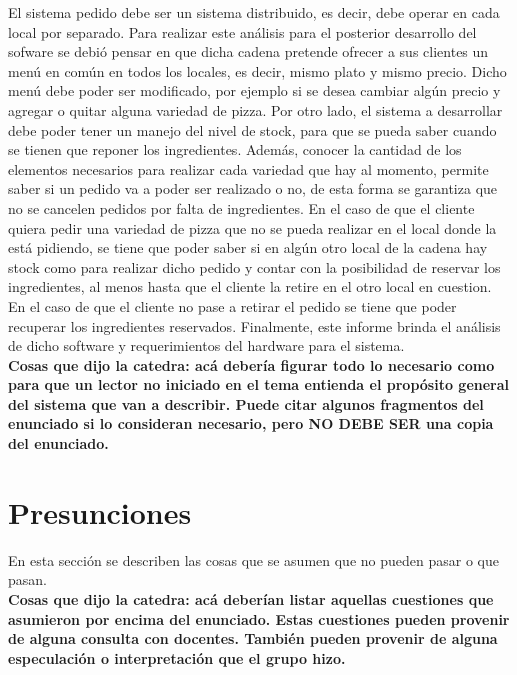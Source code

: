 \documentclass[a4paper,10pt]{article}
\begin{document}
El sistema pedido debe ser un sistema distribuido, es decir, debe operar en cada local por separado. Para realizar este an\'alisis para el posterior desarrollo del sofware se debi\'o pensar en que dicha cadena pretende ofrecer a sus clientes un men\'u en com\'un en todos los locales, es decir, mismo plato y mismo precio. Dicho men\'u debe poder ser modificado, por ejemplo si se desea cambiar alg\'un precio y agregar o quitar alguna variedad de pizza. Por otro lado, el sistema a desarrollar debe poder tener un manejo del nivel de stock, para que se pueda saber cuando se tienen que reponer los ingredientes. Adem\'as, conocer la cantidad de los elementos necesarios para realizar cada variedad que hay al momento, permite saber si un pedido va a poder ser realizado o no, de esta forma se garantiza que no se cancelen pedidos por falta de ingredientes. En el caso de que el cliente quiera pedir una variedad de pizza que no se pueda realizar en el local donde la est\'a pidiendo, se tiene que poder saber si en alg\'un otro local de la cadena hay stock como para realizar dicho pedido y contar con la posibilidad de reservar los ingredientes, al menos hasta que el cliente la retire en el otro local en cuestion. En el caso de que el cliente no pase a retirar el pedido se tiene que poder recuperar los ingredientes reservados. Finalmente, este informe brinda el an\'alisis de dicho software y requerimientos del hardware para el sistema.
\\
\textbf{Cosas que dijo la catedra: acá debería figurar todo lo necesario como para que un lector no iniciado en el tema entienda el propósito general del sistema que van a describir. Puede citar algunos fragmentos del enunciado si lo consideran necesario, pero NO DEBE SER una copia del enunciado.}

\newpage
\section*{Presunciones}
En esta secci\'on se describen las cosas que se asumen que no pueden pasar o que pasan.\\
\textbf{Cosas que dijo la catedra: acá deberían listar aquellas cuestiones que asumieron por encima del enunciado. Estas cuestiones pueden provenir de alguna consulta con docentes. También pueden provenir de alguna especulación o interpretación que el grupo hizo.}
\\
\end{document}
